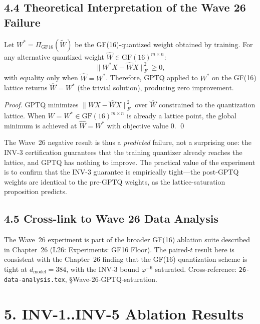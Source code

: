 \subsection{4.4 Theoretical Interpretation of the Wave 26 Failure}

\begin{proposition}
  \label{prop:gptq-saturation}
  Let \(W^* = \Pi_{\mathrm{GF16}}(\tilde{W})\) be the GF(16)-quantized
  weight obtained by training.  For any alternative quantized weight
  \(\hat{W} \in \mathrm{GF}(16)^{m \times n}\):
  \[
    \|W^* X - \hat{W} X\|_F^2 \geq 0,
  \]
  with equality only when \(\hat{W} = W^*\).  Therefore, GPTQ applied
  to \(W^*\) on the GF(16) lattice returns \(\hat{W} = W^*\)
  (the trivial solution), producing zero improvement.
\end{proposition}

\begin{proof}
  GPTQ minimizes $\|WX - \hat{W}X\|_F^2$ over \(\hat{W}\) constrained
  to the quantization lattice.  When \(W = W^* \in \mathrm{GF}(16)^{m\times n}\)
  is already a lattice point, the global minimum is achieved at
  \(\hat{W} = W^*\) with objective value 0. \qed
\end{proof}

The Wave~26 negative result is thus a \emph{predicted} failure,
not a surprising one: the INV-3 certification guarantees that
the training quantizer already reaches the lattice, and GPTQ has
nothing to improve.  The practical value of the experiment is to
confirm that the INV-3 guarantee is empirically tight---the
post-GPTQ weights are identical to the pre-GPTQ weights, as the
lattice-saturation proposition predicts.

\subsection{4.5 Cross-link to Wave 26 Data Analysis}

The Wave~26 experiment is part of the broader GF(16) ablation suite
described in Chapter~26 (L26: Experiments: GF16 Floor).  The paired-$t$
result here is consistent with the Chapter~26 finding that the GF(16)
quantization scheme is tight at $d_{\mathrm{model}} = 384$, with the
INV-3 bound \(\varphi^{-6}\) saturated.  Cross-reference:
\texttt{26-data-analysis.tex}, §Wave-26-GPTQ-saturation.

\section{5. INV-1..INV-5 Ablation Results}
\label{sec:28-invariant-ablations}

